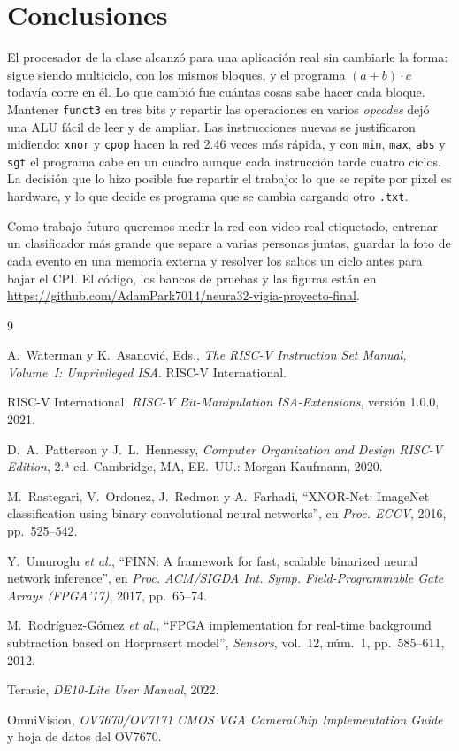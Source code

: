 \documentclass[conference,letterpaper,10pt]{IEEEtran}
\newcommand{\sig}[1]{{\small\texttt{#1}}}
\newcommand{\repo}{https://github.com/AdamPark7014/neura32-vigia-proyecto-final}
\begin{document}
\section{Conclusiones}

El procesador de la clase alcanzó para una aplicación real sin cambiarle la forma: sigue siendo multiciclo, con los mismos bloques,
y el programa $(a+b)\cdot c$ todavía corre en él. Lo que cambió fue cuántas cosas sabe hacer cada bloque. Mantener \sig{funct3} en
tres bits y repartir las operaciones en varios \emph{opcodes} dejó una ALU fácil de leer y de ampliar. Las instrucciones nuevas se
justificaron midiendo: \sig{xnor} y \sig{cpop} hacen la red 2.46 veces más rápida, y con \sig{min}, \sig{max}, \sig{abs} y
\sig{sgt} el programa cabe en un cuadro aunque cada instrucción tarde cuatro ciclos. La decisión que lo hizo posible fue repartir
el trabajo: lo que se repite por pixel es hardware, y lo que decide es programa que se cambia cargando otro \sig{.txt}.

Como trabajo futuro queremos medir la red con video real etiquetado, entrenar un clasificador más grande que separe a varias
personas juntas, guardar la foto de cada evento en una memoria externa y resolver los saltos un ciclo antes para bajar el CPI. El
código, los bancos de pruebas y las figuras están en \url{\repo}.

\balance
\begin{thebibliography}{9}
\footnotesize

A.~Waterman y K.~Asanović, Eds., \emph{The RISC-V Instruction Set Manual, Volume~I: Unprivileged ISA}. RISC-V International.

RISC-V International, \emph{RISC-V Bit-Manipulation ISA-Extensions}, versión 1.0.0, 2021.

D.~A.~Patterson y J.~L.~Hennessy, \emph{Computer Organization and Design RISC-V Edition}, 2.ª ed. Cambridge, MA, EE.~UU.:
Morgan Kaufmann, 2020.

M.~Rastegari, V.~Ordonez, J.~Redmon y A.~Farhadi, ``XNOR-Net: ImageNet classification using binary convolutional neural
networks'', en \emph{Proc. ECCV}, 2016, pp.~525--542.

Y.~Umuroglu \emph{et al.}, ``FINN: A framework for fast, scalable binarized neural network inference'', en \emph{Proc.
ACM/SIGDA Int. Symp. Field-Programmable Gate Arrays (FPGA'17)}, 2017, pp.~65--74.

M.~Rodríguez-Gómez \emph{et al.}, ``FPGA implementation for real-time background subtraction based on Horprasert model'',
\emph{Sensors}, vol.~12, núm.~1, pp.~585--611, 2012.

Terasic, \emph{DE10-Lite User Manual}, 2022.

OmniVision, \emph{OV7670/OV7171 CMOS VGA CameraChip Implementation Guide} y hoja de datos del OV7670.

\end{thebibliography}
\end{document}
